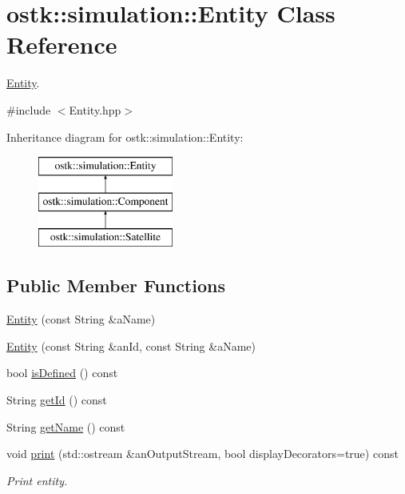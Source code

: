 \hypertarget{classostk_1_1simulation_1_1_entity}{}\section{ostk\+:\+:simulation\+:\+:Entity Class Reference}
\label{classostk_1_1simulation_1_1_entity}


\hyperlink{classostk_1_1simulation_1_1_entity}{Entity}.  




{\ttfamily \#include $<$Entity.\+hpp$>$}

Inheritance diagram for ostk\+:\+:simulation\+:\+:Entity\+:\begin{figure}[H]
\begin{center}
\leavevmode
\includegraphics[height=3.000000cm]{classostk_1_1simulation_1_1_entity}
\end{center}
\end{figure}
\subsection*{Public Member Functions}
\begin{DoxyCompactItemize}
\item 
\hyperlink{classostk_1_1simulation_1_1_entity_a929819736161db5935b29b84da8a97aa}{Entity} (const String \&a\+Name)
\item 
\hyperlink{classostk_1_1simulation_1_1_entity_ae4ee439011cfcb1811d31bdb8db871fa}{Entity} (const String \&an\+Id, const String \&a\+Name)
\item 
bool \hyperlink{classostk_1_1simulation_1_1_entity_ad3c1556400b02acdffde053348acda2f}{is\+Defined} () const
\item 
String \hyperlink{classostk_1_1simulation_1_1_entity_a33286b8807aacec430d105646c021a79}{get\+Id} () const
\item 
String \hyperlink{classostk_1_1simulation_1_1_entity_a17050a1483e16e62ca10e3b1ecade1d5}{get\+Name} () const
\item 
void \hyperlink{classostk_1_1simulation_1_1_entity_aa2238f2fe07b5ddc4594293acdfa0c23}{print} (std\+::ostream \&an\+Output\+Stream, bool display\+Decorators=true) const
\begin{DoxyCompactList}\small\item\em Print entity. \end{DoxyCompactList}\end{DoxyCompactItemize}
